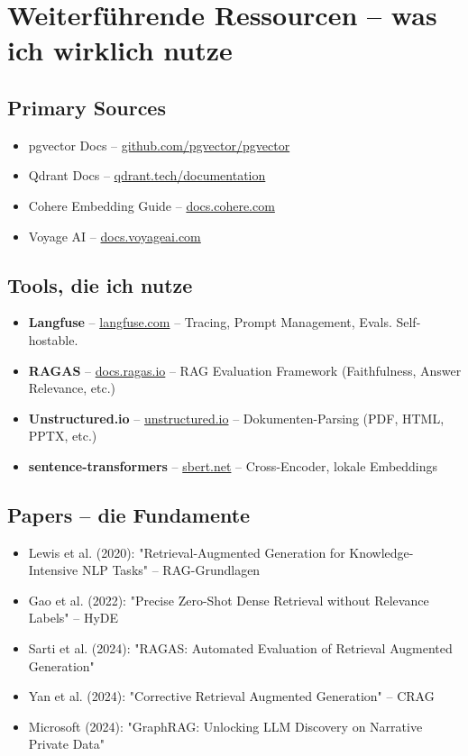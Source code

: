\section{Weiterführende Ressourcen -- was ich wirklich nutze}

\subsection{Primary Sources}
\begin{itemize}[leftmargin=*]
    \item pgvector Docs -- \href{https://github.com/pgvector/pgvector}{github.com/pgvector/pgvector}
    \item Qdrant Docs -- \href{https://qdrant.tech/documentation/}{qdrant.tech/documentation}
    \item Cohere Embedding Guide -- \href{https://docs.cohere.com/docs/embeddings}{docs.cohere.com}
    \item Voyage AI -- \href{https://docs.voyageai.com}{docs.voyageai.com}
\end{itemize}

\subsection{Tools, die ich nutze}
\begin{itemize}[leftmargin=*]
    \item \textbf{Langfuse} -- \href{https://langfuse.com}{langfuse.com} -- Tracing, Prompt Management, Evals. Self-hostable.
    \item \textbf{RAGAS} -- \href{https://docs.ragas.io}{docs.ragas.io} -- RAG Evaluation Framework (Faithfulness, Answer Relevance, etc.)
    \item \textbf{Unstructured.io} -- \href{https://unstructured.io}{unstructured.io} -- Dokumenten-Parsing (PDF, HTML, PPTX, etc.)
    \item \textbf{sentence-transformers} -- \href{https://www.sbert.net}{sbert.net} -- Cross-Encoder, lokale Embeddings
\end{itemize}

\subsection{Papers -- die Fundamente}
\begin{itemize}[leftmargin=*]
    \item Lewis et al. (2020): "Retrieval-Augmented Generation for Knowledge-Intensive NLP Tasks" -- RAG-Grundlagen
    \item Gao et al. (2022): "Precise Zero-Shot Dense Retrieval without Relevance Labels" -- HyDE
    \item Sarti et al. (2024): "RAGAS: Automated Evaluation of Retrieval Augmented Generation"
    \item Yan et al. (2024): "Corrective Retrieval Augmented Generation" -- CRAG
    \item Microsoft (2024): "GraphRAG: Unlocking LLM Discovery on Narrative Private Data"
\end{itemize}


